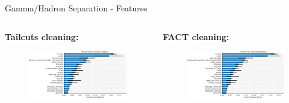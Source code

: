 \begin{frame}{Gamma/Hadron Separation - Features}
    \begin{columns}[T] %
        \begin{column}{.48\textwidth}
            \textbf{Tailcuts cleaning:}
            \vspace{5pt}
            \begin{figure}
                \includegraphics[width=\linewidth]{images/result_plots/tail1/sep_diff_4-crop.pdf}                
            \end{figure}
        \end{column}
        \begin{column}{.48\textwidth}
            \textbf{FACT cleaning:}
            \vspace{5pt}
            \begin{figure}
                \includegraphics[width=\linewidth]{images/result_plots/fact2/sep_diff_4-crop.pdf}                
            \end{figure}
        \end{column}
    \end{columns}
\end{frame}

